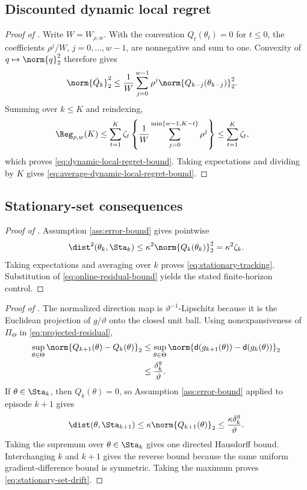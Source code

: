 \subsection{Discounted dynamic local regret}

\begin{proof}[Proof of ]
Write $W=W_{\rho,w}$.  With the convention $Q_t(\theta_t)=0$ for $t\le0$, the coefficients $\rho^j/W$, $j=0,\ldots,w-1$, are nonnegative and sum to one.  Convexity of $q\mapsto\norm{q}_2^2$ therefore gives
\begin{align*}
 \norm{\bar Q_k}_2^2
 &\le \frac1W\sum_{j=0}^{w-1}\rho^j
       \norm{Q_{k-j}(\theta_{k-j})}_2^2.
\end{align*}
Summing over $k\le K$ and reindexing,
\begin{align*}
 \Reg_{\rho,w}(K)
 &\le
 \sum_{t=1}^{K}\zeta_t
 \left\{\frac1W\sum_{j=0}^{\min\{w-1,K-t\}}\rho^j\right\}
 \le \sum_{t=1}^{K}\zeta_t,
\end{align*}
which proves \eqref{eq:dynamic-local-regret-bound}.  Taking expectations and dividing by $K$ gives \eqref{eq:average-dynamic-local-regret-bound}.
\end{proof}

\subsection{Stationary-set consequences}

\begin{proof}[Proof of ]
Assumption \ref{ass:error-bound} gives pointwise
\[
 \dist^2(\theta_k,\Sta_k)
 \le\kappa^2\norm{Q_k(\theta_k)}_2^2
 =\kappa^2\zeta_k.
\]
Taking expectations and averaging over $k$ proves \eqref{eq:stationary-tracking}.  Substitution of \eqref{eq:online-residual-bound} yields the stated finite-horizon control.
\end{proof}

\begin{proof}[Proof of ]
The normalized direction map is $\vartheta^{-1}$-Lipschitz because it is the Euclidean projection of $g/\vartheta$ onto the closed unit ball.  Using nonexpansiveness of $\Pi_\Theta$ in \eqref{eq:projected-residual},
\begin{align*}
 \sup_{\theta\in\Theta}
 \norm{Q_{k+1}(\theta)-Q_k(\theta)}_2
 &\le
 \sup_{\theta\in\Theta}
 \norm{\mathsf d(g_{k+1}(\theta))-\mathsf d(g_k(\theta))}_2\\
 &\le\frac{\delta_k^g}{\vartheta}.
\end{align*}
If $\theta\in\Sta_k$, then $Q_k(\theta)=0$, so Assumption \ref{ass:error-bound} applied to episode $k+1$ gives
\[
 \dist(\theta,\Sta_{k+1})
 \le\kappa\norm{Q_{k+1}(\theta)}_2
 \le\frac{\kappa\delta_k^g}{\vartheta}.
\]
Taking the supremum over $\theta\in\Sta_k$ gives one directed Hausdorff bound.  Interchanging $k$ and $k+1$ gives the reverse bound because the same uniform gradient-difference bound is symmetric.  Taking the maximum proves \eqref{eq:stationary-set-drift}.
\end{proof}


